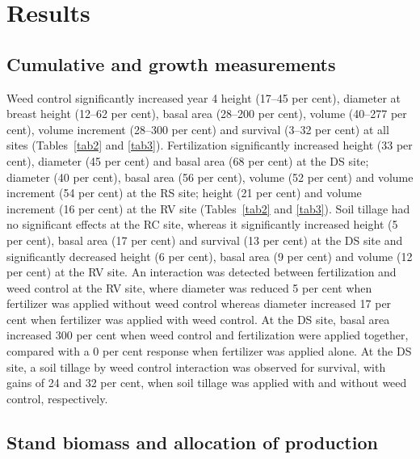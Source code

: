 \documentclass[final]{foresj}
\begin{document}
\section{Results}

\subsection{Cumulative and growth measurements}

 Weed control significantly increased year 4 height (17--45
per cent), diameter at breast height (12--62 per cent),
basal area (28--200 per cent), volume (40--277 per cent),
volume increment (28--300 per cent) and survival (3--32 per
cent) at all sites (Tables~\ref{tab2} and \ref{tab3}).
Fertilization significantly increased height (33 per cent),
diameter (45 per cent) and basal area (68 per cent) at the
DS site; diameter (40 per cent), basal area (56 per cent),
volume (52 per cent) and volume increment (54 per cent) at
the RS site; height (21 per cent) and volume increment (16
per cent) at the RV site (Tables~\ref{tab2} and
\ref{tab3}). Soil tillage had no significant effects at the
RC site, whereas it significantly increased height (5 per
cent), basal area (17 per cent) and survival (13 per cent)
at the DS site and significantly decreased height (6 per
cent), basal area (9 per cent) and volume (12 per cent) at
the RV site. An interaction was detected between
fertilization and weed control at the RV site, where
diameter was reduced 5 per cent when fertilizer was applied
without weed control whereas diameter increased 17 per cent
when fertilizer was applied with weed control. At the DS
site, basal area increased 300 per cent when weed control
and fertilization were applied together, compared with a 0
per cent response when fertilizer was applied alone. At the
DS site, a soil tillage by weed control interaction was
observed for survival, with gains of 24 and 32 per cent,
when soil tillage was applied with and without weed
control, respectively.

\subsection{Stand biomass and allocation of production}
\end{document}
